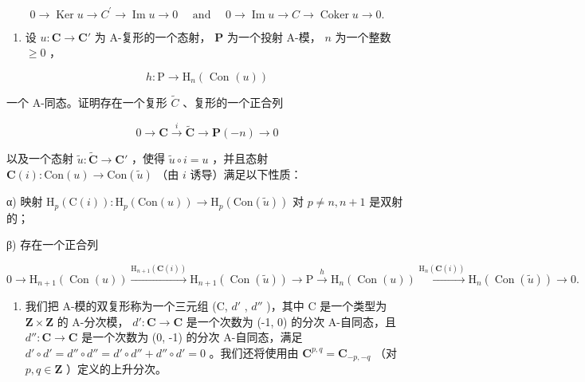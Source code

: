\[
0 \rightarrow \operatorname{Ker} u \rightarrow C ^ {\prime} \rightarrow \operatorname{Im} u \rightarrow 0 \quad \text { and } \quad 0 \rightarrow \operatorname{Im} u \rightarrow C \rightarrow \operatorname{Coker} u \rightarrow 0.
\]

\begin{enumerate}
\def\labelenumi{\arabic{enumi})}
\setcounter{enumi}{9}
\tightlist
\item
  设 \(u: \mathbf{C} \to \mathbf{C}'\) 为 A-复形的一个态射， \(\mathbf{P}\) 为一个投射 A-模， \(n\) 为一个整数 \(\geqslant 0\) ，
\end{enumerate}

\[
h: \mathrm{P} \rightarrow \mathrm{H} _ {n} (\text { Con } (u))
\]

一个 A-同态。证明存在一个复形 \(\tilde{C}\) 、复形的一个正合列

\[
0 \to \mathbf {C} \xrightarrow {i} \tilde {\mathbf {C}} \to \mathbf {P} (- n) \to 0
\]

以及一个态射 \(\tilde{u}:\tilde{\mathbf{C}}\to \mathbf{C}'\) ，使得 \(\tilde{u}\circ i = u\) ，并且态射 \(\mathbf{C}(i):\mathrm{Con}(u)\to \mathrm{Con}(\tilde{u})\) （由 \(i\) 诱导）满足以下性质：

α) 映射 \(\mathrm{H}_{p}(\mathrm{C}(i)) : \mathrm{H}_{p}(\mathrm{Con}(u)) \to \mathrm{H}_{p}(\mathrm{Con}(\tilde{u}))\) 对 \(p \neq n, n + 1\) 是双射的；

β) 存在一个正合列

\[
0 \rightarrow \mathrm{H} _ {n + 1} (\operatorname{Con} (u)) \xrightarrow {\mathrm{H} _ {n + 1} (\mathbf {C} (i))} \mathrm{H} _ {n + 1} (\operatorname{Con} (\tilde {u})) \rightarrow \mathrm{P} \xrightarrow {h} \mathrm{H} _ {n} (\operatorname{Con} (u)) \xrightarrow {\mathrm{H} _ {n} (\mathbf {C} (i))} \mathrm{H} _ {n} (\operatorname{Con} (\tilde {u})) \rightarrow 0.
\]

\begin{enumerate}
\def\labelenumi{\arabic{enumi})}
\setcounter{enumi}{10}
\tightlist
\item
  我们把 A-模的双复形称为一个三元组 (C, \(d'\) , \(d''\) )，其中 C 是一个类型为 \(\mathbf{Z} \times \mathbf{Z}\) 的 A-分次模， \(d': \mathbf{C} \to \mathbf{C}\) 是一个次数为 (-1, 0) 的分次 A-自同态，且 \(d'': \mathbf{C} \to \mathbf{C}\) 是一个次数为 (0, -1) 的分次 A-自同态，满足 \(d' \circ d' = d'' \circ d'' = d' \circ d'' + d'' \circ d' = 0\) 。我们还将使用由 \(\mathbf{C}^{p,q} = \mathbf{C}_{-p,-q}\) （对 \(p, q \in \mathbf{Z}\) ）定义的上升分次。
\end{enumerate}

